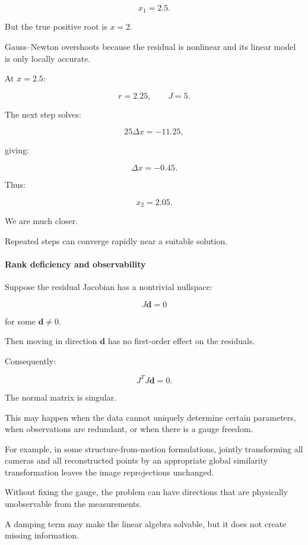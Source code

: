 \[
x_1=2.5.
\]

But the true positive root is \(x=2\).

Gauss--Newton overshoots because the residual is nonlinear and its linear model is only locally accurate.

At \(x=2.5\):

\[
r=2.25,\qquad J=5.
\]

The next step solves:

\[
25\Delta x=-11.25,
\]

giving:

\[
\Delta x=-0.45.
\]

Thus:

\[
x_2=2.05.
\]

We are much closer.

Repeated steps can converge rapidly near a suitable solution.

\paragraph{Rank deficiency and observability}\label{02-foundations-ii-ch027-rank-deficiency-and-observability}

\hypertarget{02-foundations-ii-ch027-rank-deficiency-and-observability}{}

Suppose the residual Jacobian has a nontrivial nullspace:

\[
J\mathbf d=0
\]

for some \(\mathbf d\ne0\).

Then moving in direction \(\mathbf d\) has no first-order effect on the residuals.

Consequently:

\[
J^TJ\mathbf d=0.
\]

The normal matrix is singular.

This may happen when the data cannot uniquely determine certain parameters, when observations are redundant, or when there is a gauge freedom.

For example, in some structure-from-motion formulations, jointly transforming all cameras and all reconstructed points by an appropriate global similarity transformation leaves the image reprojections unchanged.

Without fixing the gauge, the problem can have directions that are physically unobservable from the measurements.

A damping term may make the linear algebra solvable, but it does not create missing information.

